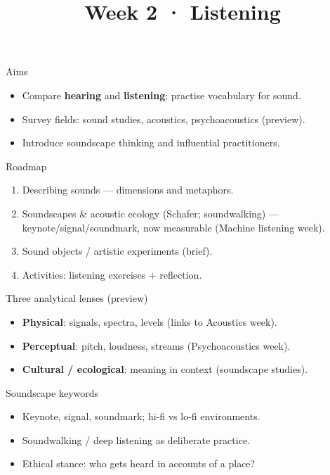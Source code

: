\documentclass[aspectratio=169]{beamer}
\title{Week 2 · Listening}
\subtitle{\coursename}
\institute{\instituteuo}
\date{}
\begin{document}
\begin{frame}
  \titlepage
\end{frame}

\begin{frame}{Aims}
  \begin{itemize}
    \item Compare \textbf{hearing} and \textbf{listening}; practise vocabulary for sound.
    \item Survey fields: sound studies, acoustics, psychoacoustics (preview).
    \item Introduce soundscape thinking and influential practitioners.
  \end{itemize}
\end{frame}

\begin{frame}{Roadmap}
  \begin{enumerate}
    \item Describing sounds — dimensions and metaphors.
    \item Soundscapes \& acoustic ecology (Schafer; soundwalking) — keynote/signal/soundmark, now measurable (Machine listening week).
    \item Sound objects / artistic experiments (brief).
    \item Activities: listening exercises + reflection.
  \end{enumerate}
\end{frame}

\begin{frame}{Three analytical lenses (preview)}
  \begin{itemize}
    \item \textbf{Physical}: signals, spectra, levels (links to Acoustics week).
    \item \textbf{Perceptual}: pitch, loudness, streams (Psychoacoustics week).
    \item \textbf{Cultural / ecological}: meaning in context (soundscape studies).
  \end{itemize}
\end{frame}

\begin{frame}{Soundscape keywords}
  \begin{itemize}
    \item Keynote, signal, soundmark; hi-fi vs lo-fi environments.
    \item Soundwalking / deep listening as deliberate practice.
    \item Ethical stance: who gets heard in accounts of a place?
  \end{itemize}
\end{frame}
\end{document}
